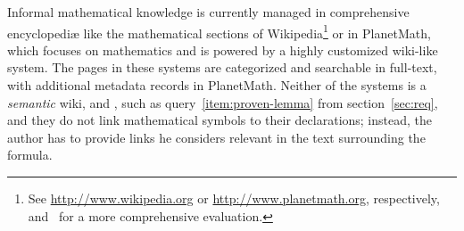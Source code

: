 \begin{background}

\label{sec:math-wiki}

Informal mathematical knowledge is currently managed in comprehensive
encyclopediæ like the mathematical sections of Wikipedia\footnote{See
  \url{http://www.wikipedia.org} %
  or \url{http://www.planetmath.org}, respectively, and~\cite{Lange:swmkm-tr07}
  for a more comprehensive evaluation.} 
or in PlanetMath\footnotemark[\value{footnote}], which focuses on mathematics
and is powered by a highly customized wiki-like system.  The pages in these
systems are categorized and searchable in full-text, with additional metadata
records in PlanetMath.  Neither of the systems is a \emph{semantic} wiki, and
, such
as query~\ref{item:proven-lemma} from section~\ref{sec:req}, and they do not
link mathematical symbols to their declarations; instead, the author has to
provide links he considers relevant in the text surrounding the formula.


\end{background}
